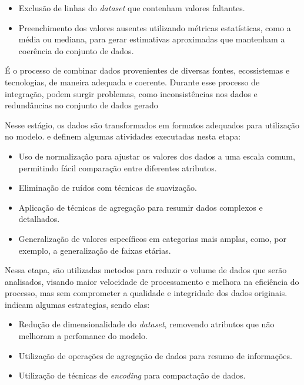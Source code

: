                 \begin{itemize}
                    \item Exclusão de linhas do \emph{dataset} que contenham valores faltantes.
                    \item Preenchimento dos valores ausentes utilizando métricas estatísticas, como a média ou mediana, 
                    para gerar estimativas aproximadas que mantenham a coerência do conjunto de dados.
                \end{itemize}
                
                É o processo de combinar dados provenientes de diversas fontes, ecossistemas e tecnologias, de maneira adequada 
                e coerente. Durante esse processo de integração, podem surgir problemas, como inconsistências nos dados e 
                redundâncias no conjunto de dados gerado~\cite{sivakumar2017, silva2021, oliveira2024}

                Nesse estágio, os dados são transformados em formatos adequados para utilização no modelo. 
                 e  definem algumas atividades executadas nesta etapa:

                \begin{itemize} 
                    \item Uso de normalização para ajustar os valores dos dados a uma escala comum, permitindo fácil comparação entre 
                    diferentes atributos. 
                    \item Eliminação de ruídos com técnicas de suavização. 
                    \item Aplicação de técnicas de agregação para resumir dados complexos e detalhados. 
                    \item Generalização de valores específicos em categorias mais amplas, como, por exemplo, a generalização de 
                    faixas etárias. 
                \end{itemize}

                Nessa etapa, são utilizadas metodos para reduzir o volume de dados que serão analisados, visando maior velocidade
                de processamento e melhora na eficiência do processo, mas sem comprometer a qualidade e integridade dos dados 
                originais.~ indicam algumas estrategias, sendo elas:
                \begin{itemize}
                    \item Redução de dimensionalidade do \emph{dataset}, removendo atributos que não melhoram a perfomance do 
                    modelo.
                    \item Utilização de operações de agregação de dados para resumo de informações.
                    \item Utilização de técnicas de \emph{encoding} para compactação de dados.
                \end{itemize}

